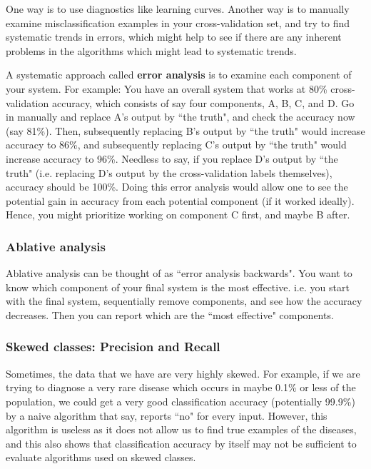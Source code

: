 \documentclass[letterpaper,10pt]{article}
\begin{document}
One way is to use diagnostics like learning curves. Another way is to manually examine misclassification examples in your cross-validation set, and try to find systematic trends in errors, which might help to see if there are any inherent problems in the algorithms which might lead to systematic trends.

A systematic approach called \textbf{error analysis} is to examine each component of your system. For example: You have an overall system that works at 80\% cross-validation accuracy, which consists of say four components, A, B, C, and D. Go in manually and replace A's output by ``the truth", and check the accuracy now (say 81\%). Then, subsequently replacing B's output by ``the truth" would increase accuracy to 86\%, and subsequently replacing C's output by ``the truth" would increase accuracy to 96\%. Needless to say, if you replace D's output by ``the truth" (i.e. replacing D's output by the cross-validation labels themselves), accuracy should be 100\%. Doing this error analysis would allow one to see the potential gain in accuracy from each potential component (if it worked ideally). Hence, you might prioritize working on component C first, and maybe B after.


\subsubsection{Ablative analysis}

Ablative analysis can be thought of as ``error analysis backwards". You want to know which component of your final system is the most effective. i.e. you start with the final system, sequentially remove components, and see how the accuracy decreases. Then you can report which are the ``most effective" components.


\subsubsection{Skewed classes: Precision and Recall}

Sometimes, the data that we have are very highly skewed. For example, if we are trying to diagnose a very rare disease which occurs in maybe 0.1\% or less of the population, we could get a very good classification accuracy (potentially 99.9\%) by a naive algorithm that say, reports ``no" for every input. However, this algorithm is useless as it does not allow us to find true examples of the diseases, and this also shows that classification accuracy by itself may not be sufficient to evaluate algorithms used on skewed classes.
\end{document}

